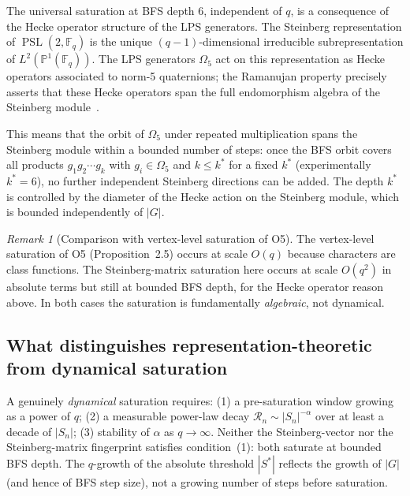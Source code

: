 \documentclass[11pt]{article}
\theoremstyle{definition}
\theoremstyle{remark}
\newtheorem{remark}[theorem]{Remark}
\DeclareMathOperator{\PSL}{PSL}
\newcommand{\F}{\mathbb{F}}
\newcommand{\Rn}{\mathcal{R}_n}
\begin{document}
    The universal saturation at BFS depth 6, independent of $q$, is a consequence of
    the Hecke operator structure of the LPS generators.
    The Steinberg representation of $\PSL(2, \F_q)$ is the unique $(q-1)$-dimensional
    irreducible subrepresentation of $L^2(\mathbb{P}^1(\F_q))$.
    The LPS generators $\Omega_5$ act on this representation as Hecke operators associated
    to norm-5 quaternions; the Ramanujan property precisely asserts that these Hecke
    operators span the full endomorphism algebra of the Steinberg module~\cite{LPS88}.

    This means that the orbit of $\Omega_5$ under repeated multiplication
    spans the Steinberg module within a bounded number of steps:
    once the BFS orbit covers all products $g_1 g_2 \cdots g_k$ with $g_i \in \Omega_5$
    and $k \leq k^*$ for a fixed $k^*$ (experimentally $k^* = 6$), no further
    independent Steinberg directions can be added.
    The depth $k^*$ is controlled by the diameter of the Hecke action on the Steinberg
    module, which is bounded independently of $|G|$.

    \begin{remark}[Comparison with vertex-level saturation of O5]
      \label{rem:vertex-compare}
      The vertex-level saturation of O5 (Proposition~2.5) occurs at scale $O(q)$ because
      characters are class functions.
      The Steinberg-matrix saturation here occurs at scale $O(q^2)$ in absolute terms but
      still at bounded BFS depth, for the Hecke operator reason above.
      In both cases the saturation is fundamentally \emph{algebraic}, not dynamical.
    \end{remark}

  \subsection{What distinguishes representation-theoretic from dynamical saturation}
    \label{ssec:rep-vs-dyn}

    A genuinely \emph{dynamical} saturation requires:
    (1) a pre-saturation window growing as a power of $q$;
    (2) a measurable power-law decay $\Rn \sim |S_n|^{-\alpha}$ over at least a decade
    of $|S_n|$;
    (3) stability of $\alpha$ as $q \to \infty$.
    Neither the Steinberg-vector nor the Steinberg-matrix fingerprint satisfies condition~(1):
    both saturate at bounded BFS depth.
    The $q$-growth of the absolute threshold $|S^*|$ reflects the growth of $|G|$ (and
    hence of BFS step size), not a growing number of steps before saturation.
\end{document}
